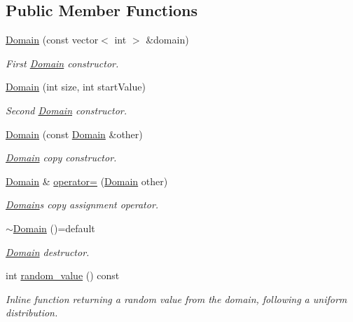 \subsection*{Public Member Functions}
\begin{DoxyCompactItemize}
\item 
\hyperlink{classghost_1_1Domain_adbdf32b7d0129175ec320f4b7c10132e}{Domain} (const vector$<$ int $>$ \&domain)
\begin{DoxyCompactList}\small\item\em First \hyperlink{classghost_1_1Domain}{Domain} constructor. \end{DoxyCompactList}\item 
\hyperlink{classghost_1_1Domain_a6a9f7b0aec78acb0b0f4edefaea7a6e9}{Domain} (int size, int start\+Value)
\begin{DoxyCompactList}\small\item\em Second \hyperlink{classghost_1_1Domain}{Domain} constructor. \end{DoxyCompactList}\item 
\hyperlink{classghost_1_1Domain_ae2419e072b48d1aaa5e9aedc36babbb6}{Domain} (const \hyperlink{classghost_1_1Domain}{Domain} \&other)
\begin{DoxyCompactList}\small\item\em \hyperlink{classghost_1_1Domain}{Domain} copy constructor. \end{DoxyCompactList}\item 
\hyperlink{classghost_1_1Domain}{Domain} \& \hyperlink{classghost_1_1Domain_a69c6fb58d1811b8306d1dc8b0aaa6778}{operator=} (\hyperlink{classghost_1_1Domain}{Domain} other)
\begin{DoxyCompactList}\small\item\em \hyperlink{classghost_1_1Domain}{Domain}\textquotesingle{}s copy assignment operator. \end{DoxyCompactList}\item 
\hyperlink{classghost_1_1Domain_aa5d4791c2f90c021d9f19746f4694039}{$\sim$\+Domain} ()=default
\begin{DoxyCompactList}\small\item\em \hyperlink{classghost_1_1Domain}{Domain} destructor. \end{DoxyCompactList}\item 
int \hyperlink{classghost_1_1Domain_a5d12f840be7a0ddd673c85d70426a75e}{random\+\_\+value} () const 
\begin{DoxyCompactList}\small\item\em Inline function returning a random value from the domain, following a uniform distribution. \end{DoxyCompactList}\item 

\end{DoxyCompactItemize}
